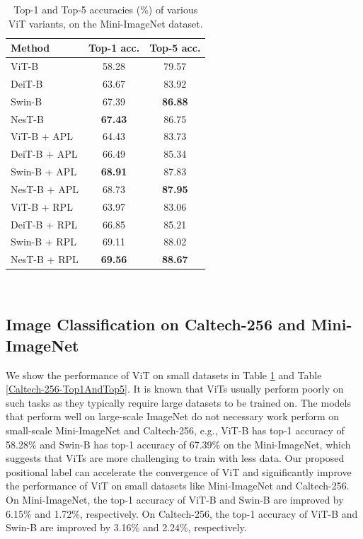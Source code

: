 \documentclass{article}
\begin{document}
\begin{table}[h]
   \centering
   \caption{Top-1 and Top-5 accuracies (\%) of various ViT variants, on the Mini-ImageNet dataset.}
   \begin{tabular}{l|c|c}
      \hline %
      Method                   & Top-1 acc.      & Top-5 acc.      \\
      \hline %
      ViT-B \cite{DBLP:journals/corr/abs-2010-11929}      & 58.28     &79.57     \\
      DeiT-B \cite{pmlr-v139-touvron21a}    & 63.67     &83.92     \\
      Swin-B \cite{Liu_2021_ICCV}    & 67.39     &\textbf{86.88}     \\
      NesT-B \cite{zhang2022nested}   & \textbf{67.43}     &86.75     \\
      \hline %
      ViT-B + APL      & 64.43     &83.73     \\
      DeiT-B + APL    & 66.49     &85.34     \\
      Swin-B + APL    & \textbf{68.91}     &87.83     \\
      NesT-B + APL    & 68.73     &\textbf{87.95}     \\
      \hline %
      ViT-B + RPL      & 63.97     &83.06     \\
      DeiT-B + RPL    & 66.85     &85.21     \\
      Swin-B + RPL    & 69.11     &88.02     \\
      NesT-B + RPL    & \textbf{69.56}     &\textbf{88.67}     \\
      \hline %
   \end{tabular} \\
   \label{Mini-ImageNet-Top1AndTop5}
\end{table}

\subsection{Image Classiﬁcation on Caltech-256 and Mini-ImageNet}

We show the performance of ViT on small datasets in Table \ref{Mini-ImageNet-Top1AndTop5} and Table \ref{Caltech-256-Top1AndTop5}. It is known that ViTs usually perform poorly on such tasks as they typically require large datasets to be trained on. The models that perform well on large-scale ImageNet do not necessary work perform on small-scale Mini-ImageNet and Caltech-256, e.g., ViT-B has top-1 accuracy of 58.28\% and Swin-B has top-1 accuracy of 67.39\% on the Mini-ImageNet, which suggests that ViTs are more challenging to train with less data. Our proposed positional label can accelerate the convergence of ViT and significantly improve the performance of ViT on small datasets like Mini-ImageNet and Caltech-256. On Mini-ImageNet, the top-1 accuracy of ViT-B and Swin-B are improved by 6.15\% and 1.72\%, respectively. On Caltech-256, the top-1 accuracy of ViT-B and Swin-B are improved by 3.16\% and 2.24\%, respectively.
\end{document}

